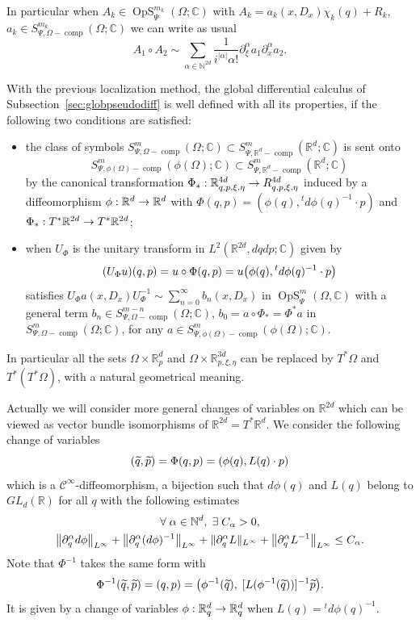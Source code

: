 \documentclass[10pt]{amsart}
\theoremstyle{definition}\newtheorem{defi}[theo]{Definition}\newtheorem{rema}[theo]{Remark}\newtheorem{exam}[theo]{Example}\newtheorem{exem}[theo]{Example}\newtheorem{nota}[theo]{Notation}
\newcommand{\C}{\mathbb{C}}
\newcommand{\R}{\mathbb{R}}
\newcommand{\N}{\mathbb{N}}
\newcommand{\clC}{\mathcal{C}}
\DeclareMathOperator{\OpS}{OpS}
\DeclareMathOperator{\ccomp}{comp}
\let\oldtilde\tilde
\renewcommand*{\tilde}[1]{\mathchoice{\widetilde{#1}}{\widetilde{#1}}{\oldtilde{#1}}{\oldtilde{#1}}}
\let\oldexists\exists
\renewcommand*{\exists}{\mathrel{\oldexists}}
\let\oldforall\forall
\renewcommand*{\forall}{\mathrel{\oldforall}}
\let\originalleft\left
\let\originalright\right
\renewcommand{\left}{\mathopen{}\mathclose\bgroup\originalleft}
\renewcommand{\right}{\aftergroup\egroup\originalright}
\renewcommand*{\to}{\mathchoice{\longrightarrow}{\rightarrow}{\rightarrow}{\rightarrow}}
\begin{document}
In particular when $A_{k}\in \OpS^{m_{k}}_{\Psi}(\Omega;\C)$ with $A_{k}=a_{k}(x,D_{x})\chi_{k}(q)+R_{k}$, $a_{k}\in S^{m_{k}}_{\Psi,\Omega-\ccomp}(\Omega;\C)$ we can write as usual
\[
A_{1}\circ A_{2}\sim \sum_{\alpha \in \N^{2d}}\frac{1}{i^{|\alpha|}\alpha!}\partial_{\xi}^{\alpha}a_{1}\partial_{x}^{\alpha}a_{2}.
\]

With the previous localization method, the global differential calculus of Subsection~\ref{sec:globpseudodiff} is well defined with all its properties, if the following two conditions are satisfied:
\begin{itemize}
\item the class of symbols $S^{m}_{\Psi,\Omega-\ccomp}(\Omega;\C)\subset S^{m}_{\Psi,\R^{d}-\ccomp}(\R^{d};\C)$ is sent onto 
\[
S^{m}_{\Psi,\phi(\Omega)-\ccomp}(\phi(\Omega);\C) \subset S^m_{\Psi,\R^d-\ccomp}(\R^d;\C)
\]
by the canonical transformation $\Phi_{*}: \R^{4d}_{q,p,\xi,\eta}\to R^{4d}_{q,p,\xi,\eta}$ induced by a diffeomorphism $\phi:\R^{d}\to \R^{d}$ with $\Phi(q,p)=(\phi(q),{}^{t}d\phi(q)^{-1}\cdot p)$ and $\Phi_{*}:T^{*}\R^{2d}\to T^{*}\R^{2d}$;
\item when $U_{\Phi}$ is the unitary transform in $L^{2}(\R^{2d},dqdp;\C)$ given by
\[
(U_{\Phi}u)(q,p)=u\circ{\Phi(q,p)}=u\left(\phi(q),{}^{t}d\phi(q)^{-1}\cdot p\right)
\]
satisfies $U_{\Phi}a(x,D_{x})U_{\Phi}^{-1}\sim \sum_{n=0}^{\infty}b_{n}(x,D_{x})$ in $\OpS^{m}_{\Psi}(\Omega,\C)$ with a general term $b_{n}\in S^{m-n}_{\Psi, \Omega-\ccomp}(\Omega;\C)$, $b_{0}=a\circ \Phi_{*}=\Phi^{*}a$ in $S^{m}_{\Psi,\Omega-\ccomp}(\Omega;\C)$, for any $a\in S^{m}_{\Psi,\phi(\Omega)-\ccomp}(\phi(\Omega);\C)$.
\end{itemize}
In particular all the sets $\Omega\times\R^{d}_{p}$ and $\Omega\times \R^{3d}_{p,\xi,\eta}$ can be replaced by $T^{*}\Omega$ and $T^{*}(T^{*}\Omega)$, with a natural geometrical meaning.

Actually we will consider more general changes of variables on $\R^{2d}$ which can be viewed as vector bundle isomorphisms of $\R^{2d}=T^{*}\R^{d}$. We consider the following change of variables
\begin{equation}\label{eq:defPhi}
(\tilde{q},\tilde{p})=\Phi(q,p)=(\phi(q), L(q)\cdot p)
\end{equation}
which is a $\clC^{\infty}$-diffeomorphism, a bijection such that $d\phi(q)$ and $L(q)$ belong to $GL_{d}(\R)$ for all $q$ with the following estimates
\begin{equation}\label{eq:estimPhi}
\begin{gathered}
\forall \alpha\in \N^{d},\;\exists C_{\alpha}>0,\\
\left\|\partial_{q}^{\alpha}d\phi\right\|_{L^{\infty}}+\left\|\partial_{q}^{\alpha}(d\phi)^{-1}\right\|_{L^{\infty}}+\|\partial_{q}^{\alpha}L\|_{L^{\infty}}+\left\|\partial_{q}^{\alpha}L^{-1}\right\|_{L^{\infty}}\leq C_{\alpha}.
\end{gathered}
\end{equation}
Note that $\Phi^{-1}$ takes the same form with
\[
\Phi^{-1}(\tilde{q},\tilde{p})=(q,p)=\left(\phi^{-1}(\tilde{q}),\;[L(\phi^{-1}(\tilde{q}))]^{-1}\tilde{p}\right).
\]
It is given by a change of variables $\phi:\R^{d}_{q}\to \R^{d}_{q}$ when $L(q)={}^{t}d\phi(q)^{-1}$.
\end{document}
